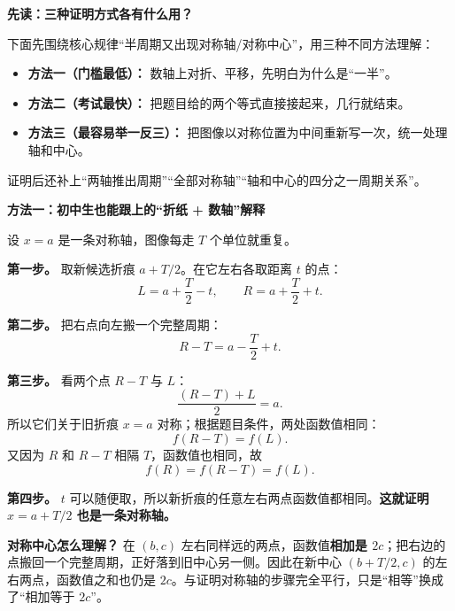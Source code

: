 \clearpage
\begin{proofbox}
\textbf{\textcolor{CProof}{先读：三种证明方式各有什么用？}}

下面先围绕核心规律“半周期又出现对称轴/对称中心”，用三种不同方法理解：
\begin{itemize}[leftmargin=*,itemsep=0.25em]
\item \textbf{方法一（门槛最低）：} 数轴上对折、平移，先明白为什么是“一半”。
\item \textbf{方法二（考试最快）：} 把题目给的两个等式直接接起来，几行就结束。
\item \textbf{方法三（最容易举一反三）：} 把图像以对称位置为中间重新写一次，统一处理轴和中心。
\end{itemize}
证明后还补上“两轴推出周期”“全部对称轴”“轴和中心的四分之一周期关系”。

\medskip
\textbf{\textcolor{CProof}{方法一：初中生也能跟上的“折纸 + 数轴”解释}}



设 $x=a$ 是一条对称轴，图像每走 $T$ 个单位就重复。

\textbf{第一步。} 取新候选折痕 $a+T/2$。在它左右各取距离 $t$ 的点：
\[
L=a+\frac T2-t,\qquad R=a+\frac T2+t.
\]

\textbf{第二步。} 把右点向左搬一个完整周期：
\[
R-T=a-\frac T2+t.
\]

\textbf{第三步。} 看两个点 $R-T$ 与 $L$：
\[
\frac{(R-T)+L}{2}=a.
\]
所以它们关于旧折痕 $x=a$ 对称；根据题目条件，两处函数值相同：
\[
f(R-T)=f(L).
\]
又因为 $R$ 和 $R-T$ 相隔 $T$，函数值也相同，故
\[
f(R)=f(R-T)=f(L).
\]

\textbf{第四步。} $t$ 可以随便取，所以新折痕的任意左右两点函数值都相同。\textbf{这就证明 $x=a+T/2$ 也是一条对称轴。}

\textbf{对称中心怎么理解？} 在 $(b,c)$ 左右同样远的两点，函数值\textbf{相加是 $2c$}；把右边的点搬回一个完整周期，正好落到旧中心另一侧。因此在新中心 $(b+T/2,c)$ 的左右两点，函数值之和也仍是 $2c$。与证明对称轴的步骤完全平行，只是“相等”换成了“相加等于 $2c$”。

\medskip

\end{proofbox}
\clearpage
